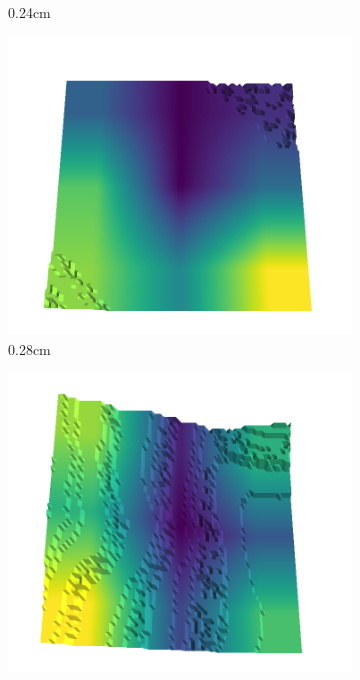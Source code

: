 \documentclass[../document.tex]{subfiles}
\begin{document}
\begin{figure}[H]
\begin{subfigure}[b]{0.242\linewidth}
    \caption{0.24cm}
    \end{subfigure}
    \begin{subfigure}[b]{0.242\linewidth}
    \includegraphics[width=\linewidth]{../img/5/quarry/best/36-patch-3d-majavi-colormap-10.png}
    \caption{0.28cm}
    \end{subfigure}
    \begin{subfigure}[b]{0.242\linewidth}
    \includegraphics[width=\linewidth]{../img/5/quarry/best/38-patch-3d-majavi-colormap-15.png}

\end{subfigure}
\end{figure}
\end{document}

